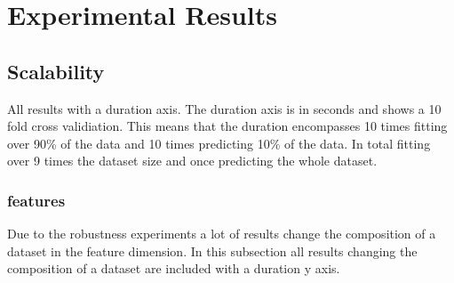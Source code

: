 \documentclass[a4paper,10pt]{article}
\begin{document}
\section{Experimental Results} \label{Chapter4}


\subsection{Scalability}
All results with a duration axis. The duration axis is in seconds and shows a 10 fold cross validiation. This means that the duration encompasses 10 times fitting over 90\% of the data and 10 times predicting 10\% of the data. In total fitting over 9 times the dataset size and once predicting the whole dataset.

\subsubsection{features}
Due to the robustness experiments a lot of results change the composition of a dataset in the feature dimension. In this subsection all results changing the composition of a dataset are included with a duration y axis. 
\end{document}

